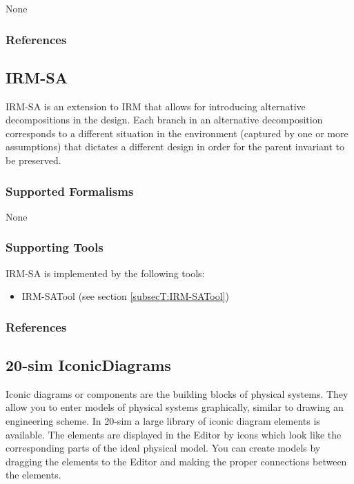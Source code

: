 None


\subsubsection{References}





\subsection{IRM-SA}
\label{subsecL:IRM-SA}


IRM-SA is an extension to IRM that allows for introducing alternative decompositions in the design. Each branch in an alternative decomposition corresponds to a different situation in the environment (captured by one or more assumptions) that dictates a different design in order for the parent invariant to be preserved.

\subsubsection{Supported Formalisms}

None


\subsubsection{Supporting Tools}

IRM-SA is implemented by the following tools:
\begin{itemize}
	\item IRM-SATool (see section \ref{subsecT:IRM-SATool})
\end{itemize}


\subsubsection{References}





\subsection{20-sim IconicDiagrams}
\label{subsecL:IconicDiagrams}


Iconic diagrams or components are the building blocks of physical systems. They allow you to enter models of physical systems graphically, similar to drawing an engineering scheme. In 20-sim a large library of iconic diagram elements is available. The elements are displayed in the Editor by icons which look like the corresponding parts of the ideal physical model. You can create models by dragging the elements to the Editor and making the proper connections between the elements.

